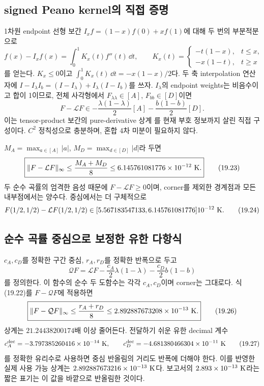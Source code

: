 \subsection{signed Peano kernel의 직접 증명}
1차원 endpoint 선형 보간 $I_xf=(1-x)f(0)+xf(1)$에 대해
두 번의 부분적분으로
\[
f(x)-I_xf(x)=\int_0^1K_x(t)f''(t)\,\dd t,\qquad
K_x(t)=
\begin{cases}
-t(1-x),&t\le x,\\
-x(1-t),&t\ge x
\end{cases}
\tag{19.21}
\]
를 얻는다.
$K_x\le0$이고 $\int_0^1K_x(t)\,\dd t=-x(1-x)/2$다.
두 축 interpolation 연산자에
$I-I_\lambda I_b=(I-I_\lambda)+I_\lambda(I-I_b)$를 쓰자.
$I_\lambda$의 endpoint weights는 비음수이고 합이 1이므로,
전체 사각형에서 $F_{\lambda\lambda}\in[A]$, $F_{bb}\in[D]$이면
\[
\boxed{
F-\mathcal LF\in
-\frac{\lambda(1-\lambda)}2[A]
-\frac{b(1-b)}2[D].}
\tag{19.22}
\]
이는 tensor-product 보간의 pure-derivative 상계 \cite{MR09}를
현재 부호 정보까지 살린 직접 구성이다.
$C^2$ 정칙성으로 충분하며, 혼합 4차 미분이 필요하지 않다.

$M_A=\max_{a\in[A]}|a|$, $M_D=\max_{d\in[D]}|d|$라 두면
\[
\boxed{\|F-\mathcal LF\|_\infty\le\frac{M_A+M_D}{8}
\le6.145761081776\times10^{-12}\ {\rm K}.}
\tag{19.23}
\]
두 순수 곡률의 엄격한 음성 때문에
$F-\mathcal LF\ge0$이며,
corner를 제외한 경계점과 모든 내부점에서는 양수다.
중심에서는 더 구체적으로
\[
F(1/2,1/2)-\mathcal LF(1/2,1/2)
\in[5.567183547133,6.145761081776]10^{-12}\ {\rm K}.
\tag{19.24}
\]

\subsection{순수 곡률 중심으로 보정한 유한 다항식}
$c_A,c_D$를 정확한 구간 중심,
$r_A,r_D$를 정확한 반폭으로 두고
\[
\mathcal QF=\mathcal LF
-\frac{c_A}2\lambda(1-\lambda)
-\frac{c_D}2b(1-b)
\tag{19.25}
\]
를 정의한다.
이 함수의 순수 두 도함수는 각각 $c_A,c_D$이며 corner는 그대로다.
식 (19.22)를 $F-\mathcal QF$에 적용하면
\[
\boxed{\|F-\mathcal QF\|_\infty\le\frac{r_A+r_D}{8}
\le2.892887673208\times10^{-13}\ {\rm K}.}
\tag{19.26}
\]
상계는 $21.24438200174$배 이상 줄어든다.
전달하기 쉬운 유한 decimal 계수
\[
c_A^{\rm dec}=-3.797385260416\times10^{-14}\ {\rm K},\qquad
c_D^{\rm dec}=-4.681380466304\times10^{-11}\ {\rm K}
\tag{19.27}
\]
를 정확한 유리수로 사용하면 중심 반올림의 거리도 반폭에 더해야 한다.
이를 반영한 실제 사용 가능 상계는
$2.892887673216\times10^{-13}\ {\rm K}$다.
보고서의 $2.893\times10^{-13}\ {\rm K}$라는 짧은 표기는 이 값을 바깥으로 반올림한 것이다.

